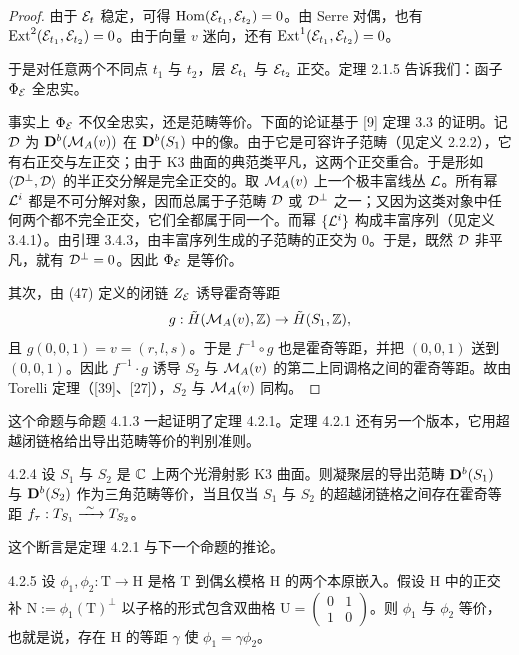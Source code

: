 \begin{proof}
由于 $\mathcal{E}_t$ 稳定，可得 $\operatorname{Hom}(\mathcal{E}_{t_1},\mathcal{E}_{t_2})=0$。由 Serre 对偶，也有 $\operatorname{Ext}^2(\mathcal{E}_{t_1},\mathcal{E}_{t_2})=0$。由于向量 $v$ 迷向，还有 $\operatorname{Ext}^1(\mathcal{E}_{t_1},\mathcal{E}_{t_2})=0$。

于是对任意两个不同点 $t_1$ 与 $t_2$，层 $\mathcal{E}_{t_1}$ 与 $\mathcal{E}_{t_2}$ 正交。定理 2.1.5 告诉我们：函子 $\Phi_{\mathcal{E}}$ 全忠实。

事实上 $\Phi_{\mathcal{E}}$ 不仅全忠实，还是范畴等价。下面的论证基于 [9] 定理 3.3 的证明。记 $\mathcal{D}$ 为 $\mathbf{D}^{b}(\mathcal{M}_A(v))$ 在 $\mathbf{D}^{b}(S_1)$ 中的像。由于它是可容许子范畴（见定义 2.2.2），它有右正交与左正交；由于 K3 曲面的典范类平凡，这两个正交重合。于是形如 $\langle\mathcal{D}^{\perp},\mathcal{D}\rangle$ 的半正交分解是完全正交的。取 $\mathcal{M}_A(v)$ 上一个极丰富线丛 $\mathcal{L}$。所有幂 $\mathcal{L}^i$ 都是不可分解对象，因而总属于子范畴 $\mathcal{D}$ 或 $\mathcal{D}^{\perp}$ 之一；又因为这类对象中任何两个都不完全正交，它们全都属于同一个。而幂 $\{\mathcal{L}^i\}$ 构成丰富序列（见定义 3.4.1）。由引理 3.4.3，由丰富序列生成的子范畴的正交为 0。于是，既然 $\mathcal{D}$ 非平凡，就有 $\mathcal{D}^{\perp}=0$。因此 $\Phi_{\mathcal{E}}$ 是等价。

其次，由 (47) 定义的闭链 $Z_{\mathcal{E}}$ 诱导霍奇等距
\begin{equation*}
g:\tilde H(\mathcal{M}_A(v),\mathbb{Z})\to\tilde H(S_1,\mathbb{Z}),
\end{equation*}
且 $g(0,0,1)=v=(r,l,s)$。于是 $f^{-1}\circ g$ 也是霍奇等距，并把 $(0,0,1)$ 送到 $(0,0,1)$。因此 $f^{-1}\cdot g$ 诱导 $S_2$ 与 $\mathcal{M}_A(v)$ 的第二上同调格之间的霍奇等距。故由 Torelli 定理（[39]、[27]），$S_2$ 与 $\mathcal{M}_A(v)$ 同构。
\end{proof}


这个命题与命题 4.1.3 一起证明了定理 4.2.1。定理 4.2.1 还有另一个版本，它用超越闭链格给出导出范畴等价的判别准则。

\begin{theorem}{4.2.4}
设 $S_1$ 与 $S_2$ 是 $\mathbb{C}$ 上两个光滑射影 K3 曲面。则凝聚层的导出范畴 $\mathbf{D}^{b}(S_1)$ 与 $\mathbf{D}^{b}(S_2)$ 作为三角范畴等价，当且仅当 $S_1$ 与 $S_2$ 的超越闭链格之间存在霍奇等距 $f_\tau:T_{S_1}\xrightarrow{\ \sim\ } T_{S_2}$。
\end{theorem}

这个断言是定理 4.2.1 与下一个命题的推论。

\begin{proposition}[{{[}33{]}}]{4.2.5}
设 $\phi_1,\phi_2:\mathrm{T}\to\mathrm{H}$ 是格 $\mathrm{T}$ 到偶幺模格 $\mathrm{H}$ 的两个本原嵌入。假设 $\mathrm{H}$ 中的正交补 $\mathrm{N}:=\phi_1(\mathrm{T})^{\perp}$ 以子格的形式包含双曲格 $\mathrm{U}=\begin{pmatrix}0&1\\1&0\end{pmatrix}$。则 $\phi_1$ 与 $\phi_2$ 等价，也就是说，存在 $\mathrm{H}$ 的等距 $\gamma$ 使 $\phi_1=\gamma\phi_2$。
\end{proposition}

